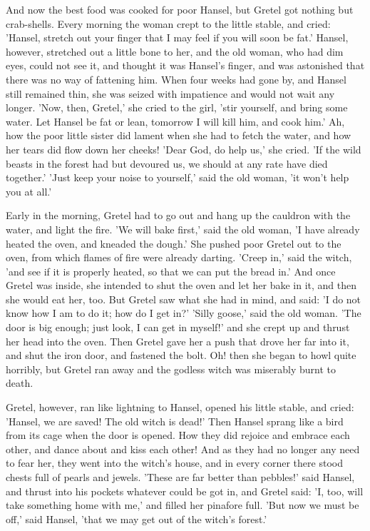 \documentclass[12pt]{book}
\begin{document}
And now the best food was cooked for poor Hansel, but Gretel got
nothing but crab-shells. Every morning the woman crept to the little
stable, and cried: 'Hansel, stretch out your finger that I may feel if
you will soon be fat.' Hansel, however, stretched out a little bone to
her, and the old woman, who had dim eyes, could not see it, and
thought it was Hansel's finger, and was astonished that there was no
way of fattening him. When four weeks had gone by, and Hansel still
remained thin, she was seized with impatience and would not wait any
longer. 'Now, then, Gretel,' she cried to the girl, 'stir yourself,
and bring some water. Let Hansel be fat or lean, tomorrow I will kill
him, and cook him.' Ah, how the poor little sister did lament when she
had to fetch the water, and how her tears did flow down her cheeks!
'Dear God, do help us,' she cried. 'If the wild beasts in the forest
had but devoured us, we should at any rate have died together.' 'Just
keep your noise to yourself,' said the old woman, 'it won't help you
at all.'

Early in the morning, Gretel had to go out and hang up the cauldron
with the water, and light the fire. 'We will bake first,' said the old
woman, 'I have already heated the oven, and kneaded the dough.' She
pushed poor Gretel out to the oven, from which flames of fire were
already darting. 'Creep in,' said the witch, 'and see if it is
properly heated, so that we can put the bread in.' And once Gretel was
inside, she intended to shut the oven and let her bake in it, and then
she would eat her, too. But Gretel saw what she had in mind, and said:
'I do not know how I am to do it; how do I get in?' 'Silly goose,'
said the old woman. 'The door is big enough; just look, I can get in
myself!' and she crept up and thrust her head into the oven. Then
Gretel gave her a push that drove her far into it, and shut the iron
door, and fastened the bolt. Oh! then she began to howl quite
horribly, but Gretel ran away and the godless witch was miserably
burnt to death.

Gretel, however, ran like lightning to Hansel, opened his little
stable, and cried: 'Hansel, we are saved! The old witch is dead!' Then
Hansel sprang like a bird from its cage when the door is opened. How
they did rejoice and embrace each other, and dance about and kiss each
other! And as they had no longer any need to fear her, they went into
the witch's house, and in every corner there stood chests full of
pearls and jewels. 'These are far better than pebbles!' said Hansel,
and thrust into his pockets whatever could be got in, and Gretel said:
'I, too, will take something home with me,' and filled her pinafore
full. 'But now we must be off,' said Hansel, 'that we may get out of
the witch's forest.'
\end{document}
